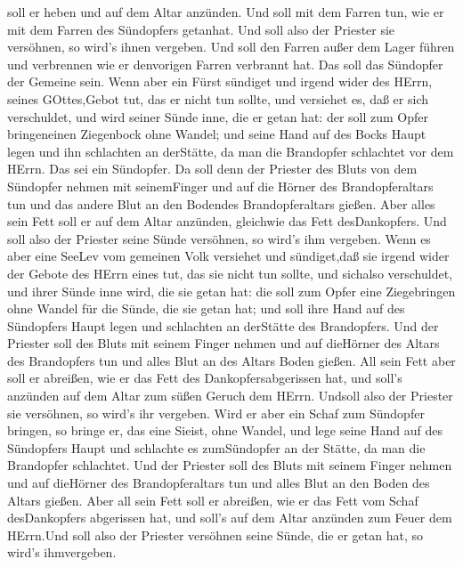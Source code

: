 soll er heben und auf dem Altar anzünden.  Und soll mit dem
Farren tun, wie er mit dem Farren des Sündopfers getanhat. Und soll also
der Priester sie versöhnen, so wird's ihnen vergeben.  Und
soll den Farren außer dem Lager führen und verbrennen wie er denvorigen
Farren verbrannt hat. Das soll das Sündopfer der Gemeine sein.
 Wenn aber ein Fürst sündiget und irgend wider des HErrn,
seines GOttes,Gebot tut, das er nicht tun sollte, und versiehet es, daß
er sich verschuldet,  und wird seiner Sünde inne, die er
getan hat: der soll zum Opfer bringeneinen Ziegenbock ohne Wandel;
 und seine Hand auf des Bocks Haupt legen und ihn
schlachten an derStätte, da man die Brandopfer schlachtet vor dem HErrn.
Das sei ein Sündopfer.  Da soll denn der Priester des Bluts
von dem Sündopfer nehmen mit seinemFinger und auf die Hörner des
Brandopferaltars tun und das andere Blut an den Bodendes
Brandopferaltars gießen.  Aber alles sein Fett soll er auf
dem Altar anzünden, gleichwie das Fett desDankopfers. Und soll also der
Priester seine Sünde versöhnen, so wird's ihm vergeben. 
Wenn es aber eine SeeLev vom gemeinen Volk versiehet und sündiget,daß
sie irgend wider der Gebote des HErrn eines tut, das sie nicht tun
sollte, und sichalso verschuldet,  und ihrer Sünde inne
wird, die sie getan hat: die soll zum Opfer eine Ziegebringen ohne
Wandel für die Sünde, die sie getan hat;  und soll ihre
Hand auf des Sündopfers Haupt legen und schlachten an derStätte des
Brandopfers.  Und der Priester soll des Bluts mit seinem
Finger nehmen und auf dieHörner des Altars des Brandopfers tun und alles
Blut an des Altars Boden gießen.  All sein Fett aber soll
er abreißen, wie er das Fett des Dankopfersabgerissen hat, und soll's
anzünden auf dem Altar zum süßen Geruch dem HErrn. Undsoll also der
Priester sie versöhnen, so wird's ihr vergeben.  Wird er
aber ein Schaf zum Sündopfer bringen, so bringe er, das eine Sieist,
ohne Wandel,  und lege seine Hand auf des Sündopfers Haupt
und schlachte es zumSündopfer an der Stätte, da man die Brandopfer
schlachtet.  Und der Priester soll des Bluts mit seinem
Finger nehmen und auf dieHörner des Brandopferaltars tun und alles Blut
an den Boden des Altars gießen.  Aber all sein Fett soll er
abreißen, wie er das Fett vom Schaf desDankopfers abgerissen hat, und
soll's auf dem Altar anzünden zum Feuer dem HErrn.Und soll also der
Priester versöhnen seine Sünde, die er getan hat, so wird's ihmvergeben.

